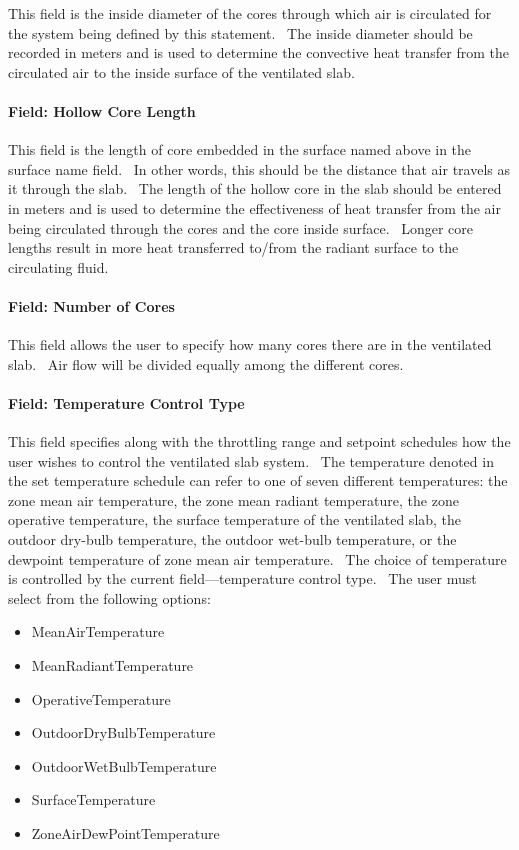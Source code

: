 This field is the inside diameter of the cores through which air is circulated for the system being defined by this statement.~ The inside diameter should be recorded in meters and is used to determine the convective heat transfer from the circulated air to the inside surface of the ventilated slab.

\paragraph{Field: Hollow Core Length}\label{field-hollow-core-length}

This field is the length of core embedded in the surface named above in the surface name field.~ In other words, this should be the distance that air travels as it through the slab.~ The length of the hollow core in the slab should be entered in meters and is used to determine the effectiveness of heat transfer from the air being circulated through the cores and the core inside surface.~ Longer core lengths result in more heat transferred to/from the radiant surface to the circulating fluid.

\paragraph{Field: Number of Cores}\label{field-number-of-cores}

This field allows the user to specify how many cores there are in the ventilated slab.~ Air flow will be divided equally among the different cores.

\paragraph{Field: Temperature Control Type}\label{field-temperature-control-type-4}

This field specifies along with the throttling range and setpoint schedules how the user wishes to control the ventilated slab system.~ The temperature denoted in the set temperature schedule can refer to one of seven different temperatures: the zone mean air temperature, the zone mean radiant temperature, the zone operative temperature, the surface temperature of the ventilated slab, the outdoor dry-bulb temperature, the outdoor wet-bulb temperature, or the dewpoint temperature of zone mean air temperature.~ The choice of temperature is controlled by the current field---temperature control type.~ The user must select from the following options:

\begin{itemize}
\item
  MeanAirTemperature
\item
  MeanRadiantTemperature
\item
  OperativeTemperature
\item
  OutdoorDryBulbTemperature
\item
  OutdoorWetBulbTemperature
\item
  SurfaceTemperature
\item
  ZoneAirDewPointTemperature
\end{itemize}

